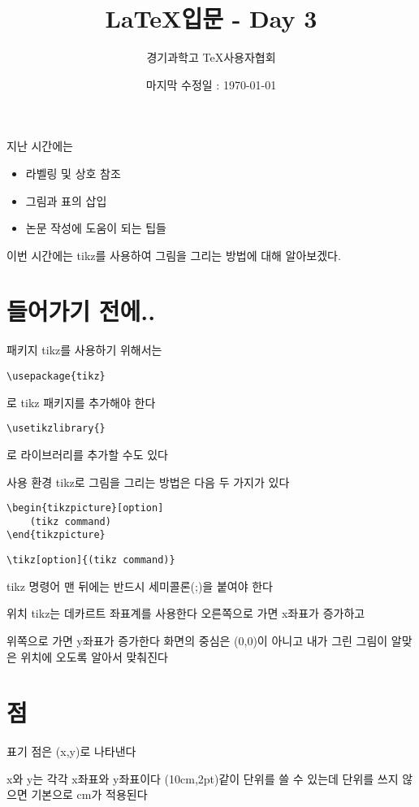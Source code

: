 \documentclass[12pt]{beamer}
\title[\LaTeX - Day 3]{\LaTeX 입문 - Day 3}
\author{경기과학고 \TeX 사용자협회}
\institute[GSHSTeXSociety]{\url{latex.gs.hs.kr}}
\date{마지막 수정일 : \today}
\begin{document}
\begin{frame}
\titlepage %
\end{frame}

\begin{frame}{지난 시간에는}
	\begin{itemize}
		\item 라벨링 및 상호 참조
		\item 그림과 표의 삽입
		\item 논문 작성에 도움이 되는 팁들
	\end{itemize}
	\vfill
	이번 시간에는 tikz를 사용하여 그림을 그리는 방법에 대해 알아보겠다.
\end{frame}

\section{들어가기 전에..}
\begin{frame}[fragile]{패키지}
	tikz를 사용하기 위해서는
	\begin{lstlisting}
\usepackage{tikz}
	\end{lstlisting}
	로 tikz 패키지를 추가해야 한다
	\vfill
	\begin{lstlisting}
\usetikzlibrary{}
	\end{lstlisting}
	로 라이브러리를 추가할 수도 있다
\end{frame}

\begin{frame}[fragile]{사용 환경}
	tikz로 그림을 그리는 방법은 다음 두 가지가 있다
	\vfill
	\begin{lstlisting}
\begin{tikzpicture}[option]
	(tikz command)
\end{tikzpicture}
	\end{lstlisting}
	\vfill
	\begin{lstlisting}
\tikz[option]{(tikz command)}
	\end{lstlisting}
	\vfill
	tikz 명령어 맨 뒤에는 반드시 세미콜론(;)을 붙여야 한다
\end{frame}

\begin{frame}{위치}
	tikz는 데카르트 좌표계를 사용한다
	\vfill
	오른쪽으로 가면 x좌표가 증가하고

	위쪽으로 가면 y좌표가 증가한다
	\vfill
	화면의 중심은 (0,0)이 아니고 내가 그린 그림이 알맞은 위치에 오도록 알아서 맞춰진다
\end{frame}

\section{점}
\begin{frame}{\secname}{표기}
	점은 (x,y)로 나타낸다
	
	x와 y는 각각 x좌표와 y좌표이다
	\vfill
	(10cm,2pt)같이 단위를 쓸 수 있는데 단위를 쓰지 않으면 기본으로 cm가 적용된다
\end{frame}
\end{document}
